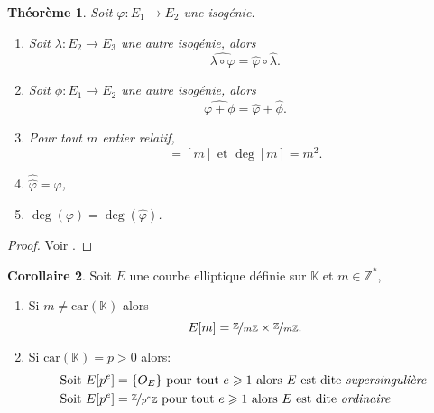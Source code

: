 \documentclass[10pt,a4paper]{book}
\theoremstyle{plain}
\newtheorem{thm}{Théorème}[chapter]
\theoremstyle{definition}
\theoremstyle{definition}
\newtheorem{cor}[thm]{Corollaire}
\theoremstyle{definition}
\theoremstyle{definition}
\theoremstyle{remark}
\theoremstyle{remark}
\theoremstyle{definition}
\begin{document}
\begin{thm}
Soit $\varphi:E_1 \rightarrow E_2$ une isogénie.
\begin{enumerate}
\item Soit $\lambda:E_2 \rightarrow E_3$ une autre isogénie, alors
\begin{equation*}
\widehat{\lambda \circ \varphi}= \widehat{\varphi} \circ \widehat{\lambda}.
\end{equation*} 
\item Soit $\phi:E_1 \rightarrow E_2$ une autre isogénie, alors
\begin{equation*}
\widehat{\varphi+\phi}=\widehat{\varphi}+\widehat{\phi}.
\end{equation*}
\item Pour tout $m$ entier relatif,
\begin{equation*}
[\widehat{m}]=[m] \text{ et } \deg[m]=m^2.
\end{equation*}
\item $\widehat{\widehat{\varphi}}=\varphi$,
\item $\deg(\varphi)=\deg(\widehat{\varphi})$.
\end{enumerate}
 
\end{thm}

\begin{proof}
Voir \cite[Theorem III.6.2]{Silv1}.
\end{proof}

\begin{cor}
Soit $E$ une courbe elliptique définie sur $\mathbb{K}$ et $m \in \mathbb{Z}^*$,
\begin{enumerate}
\item Si $m \neq \mathrm{car}(\mathbb{K})$ alors
\begin{equation*}
E[m]=\nicefrac{\mathbb{Z}}{m\mathbb{Z}} \times \nicefrac{\mathbb{Z}}{m\mathbb{Z}}. 
\end{equation*}
\item Si $\mathrm{car}(\mathbb{K})=p>0$ alors:
\begin{equation*}
\begin{alignedat}{1}
&\text{Soit } E[p^e]=\{O_E\} \text{ pour tout } e \geqslant 1 \text{ alors $E$ est dite \emph{supersingulière} }\\
&\text{Soit } E[p^e]=\nicefrac{\mathbb{Z}}{p^e\mathbb{Z}} \text{ pour tout } e \geqslant 1
\text{ alors $E$ est dite \emph{ordinaire} }\end{alignedat}
\end{equation*}
\end{enumerate}
\end{cor}
\end{document}
